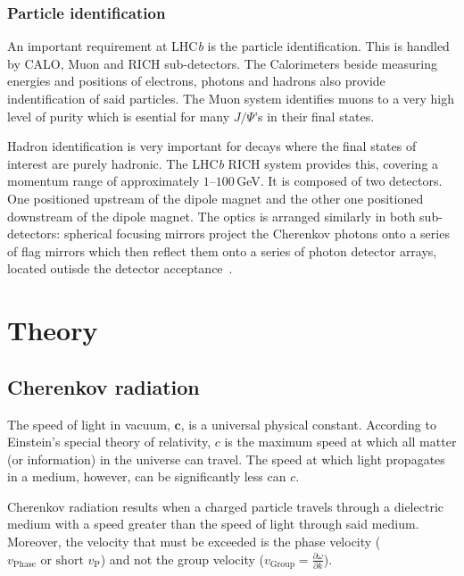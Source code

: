 \documentclass[11pt,twoside]{scrreprt}
\begin{document}
\subsection{Particle identification} %
\label{sub:particle_identification}
An important requirement at LHC\textit{b} is the particle identification. This is handled by CALO, Muon and RICH sub-detectors. The Calorimeters beside measuring energies and positions of electrons, photons and hadrons also provide indentification of said particles. The Muon system identifies muons to a very high level of purity which is esential for many \(J/\Psi\)'s in their final states.

Hadron identification is very important for decays where the final states of interest are purely hadronic. The LHC\textit{b} RICH system provides this, covering a momentum range of approximately $1$--$100$\,GeV. It is composed of two detectors. One positioned upstream of the dipole magnet and the other one positioned downstream of the dipole magnet. The optics is arranged similarly in both sub-detectors: spherical focusing mirrors project the Cherenkov photons onto a series of flag mirrors which then reflect them onto a series of photon detector arrays, located outisde the detector acceptance~\cite{Powell:2011}.



\chapter{Theory}

\section{Cherenkov radiation} %
\label{sec:cherenkov_radiation}

The speed of light in vacuum, \( \mathbf{c} \), is a universal physical constant. According to Einstein's special theory of relativity, \( c \) is the maximum speed at which all matter (or information) in the universe can travel. The speed at which light propagates in a medium, however, can be significantly less can \( c \).

Cherenkov radiation results when a charged particle travels through a dielectric medium with a speed greater than the speed of light through said medium. Moreover, the velocity that must be exceeded is the phase velocity (\( v_{\text{Phase}} \text{ or short } v_{\text{P}} \)) and not the group velocity (\( v_{\text{Group}} = \frac{\partial \omega}{\partial k} \)).
\end{document}

